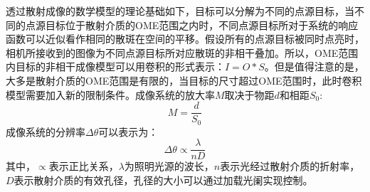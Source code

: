 透过散射成像的数学模型的理论基础如下，目标可以分解为不同的点源目标，当不同的点源目标位于散射介质的OME范围之内时，不同点源目标所对于系统的响应函数可以近似看作相同的散斑在空间的平移。假设所有的点源目标被同时点亮时，相机所接收到的图像为不同点源目标所对应散斑的非相干叠加。所以，OME范围内目标的非相干成像模型可以用卷积的形式表示：$I = O*S$。但是值得注意的是，大多是散射介质的OME范围是有限的，当目标的尺寸超过OME范围时，此时卷积模型需要加入新的限制条件。成像系统的放大率$M$取决于物距$d$和相距$S_{0}$:
\begin{equation}
    M = \frac{d}{S_{0}}
\label{eq:magnification_imgaing_system}
\end{equation}
成像系统的分辨率$\Delta \theta $可以表示为：
\begin{equation}
    \Delta \theta   \propto \frac{\lambda}{nD}
\label{eq:angleresolution_imgaing_system}
\end{equation}
其中，$\propto$表示正比关系，$\lambda$为照明光源的波长，$n$表示光经过散射介质的折射率，$D$表示散射介质的有效孔径，孔径的大小可以通过加载光阑实现控制。

